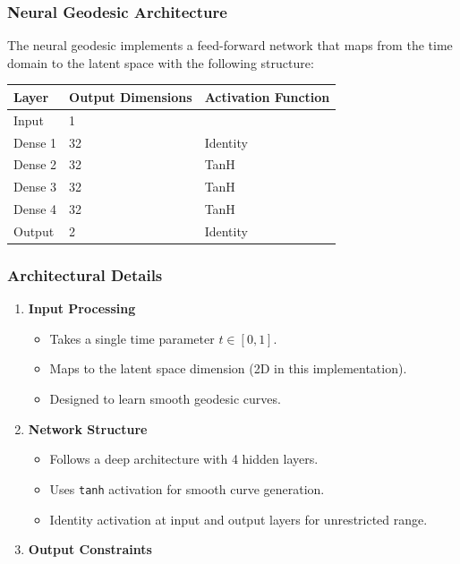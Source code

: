\documentclass[
]{scrartcl}
\providecommand{\tightlist}{%
  \setlength{\itemsep}{0pt}\setlength{\parskip}{0pt}}
\begin{document}
\begin{refsection}
\subsubsection{Neural Geodesic
Architecture}\label{neural-geodesic-architecture-1}

The neural geodesic implements a feed-forward network that maps from the
time domain to the latent space with the following structure:

\begin{longtable}[]{@{}lll@{}}
\toprule\noalign{}
Layer & Output Dimensions & Activation Function \\
\midrule\noalign{}
\endhead
\bottomrule\noalign{}
\endlastfoot
Input & 1 & \\
Dense 1 & 32 & Identity \\
Dense 2 & 32 & TanH \\
Dense 3 & 32 & TanH \\
Dense 4 & 32 & TanH \\
Output & 2 & Identity \\
\end{longtable}

\subsubsection{Architectural Details}\label{architectural-details}

\begin{enumerate}
\def\labelenumi{\arabic{enumi}.}
\tightlist
\item
  \textbf{Input Processing}

  \begin{itemize}
  \tightlist
  \item
    Takes a single time parameter \(t \in [0,1]\).
  \item
    Maps to the latent space dimension (2D in this implementation).
  \item
    Designed to learn smooth geodesic curves.
  \end{itemize}
\item
  \textbf{Network Structure}

  \begin{itemize}
  \tightlist
  \item
    Follows a deep architecture with 4 hidden layers.
  \item
    Uses \texttt{tanh} activation for smooth curve generation.
  \item
    Identity activation at input and output layers for unrestricted
    range.
  \end{itemize}
\item
  \textbf{Output Constraints}


\end{enumerate}
\end{refsection}
\end{document}
